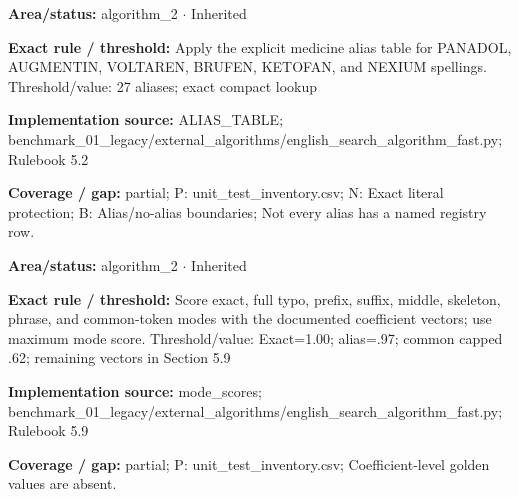 \begin{tcolorbox}[enhanced,breakable,colback=white,colframe=Muted!45,boxrule=0.45pt,arc=1.5pt,left=6pt,right=6pt,top=5pt,bottom=5pt,title={\texttt{A2-MEDICINE-ALIASES-04}},title after break={\texttt{A2-MEDICINE-ALIASES-04}\ (continued)},fonttitle=\headingfont\bfseries\color{Navy},coltitle=Navy]
\textbf{Area/status:} algorithm\_\allowbreak{}2 $\boldsymbol{\cdot}$ Inherited\par
\smallskip
\textbf{Exact rule / threshold:} Apply the explicit medicine alias table for PANADOL, AUGMENTIN, VOLTAREN, BRUFEN, KETOFAN, and NEXIUM spellings. Threshold/\allowbreak{}value: 27 aliases; exact compact lookup\par
\smallskip
\textbf{Implementation source:} ALIAS\_\allowbreak{}TABLE; benchmark\_\allowbreak{}01\_\allowbreak{}legacy/\allowbreak{}external\_\allowbreak{}algorithms/\allowbreak{}english\_\allowbreak{}search\_\allowbreak{}algorithm\_\allowbreak{}fast.py; Rulebook 5.2\par
\smallskip
\textbf{Coverage / gap:} partial; P: unit\_\allowbreak{}test\_\allowbreak{}inventory.csv; N: Exact literal protection; B: Alias/\allowbreak{}no-alias boundaries; Not every alias has a named registry row.
\end{tcolorbox}
\begin{tcolorbox}[enhanced,breakable,colback=white,colframe=Muted!45,boxrule=0.45pt,arc=1.5pt,left=6pt,right=6pt,top=5pt,bottom=5pt,title={\texttt{A2-MODE-SCORES-11}},title after break={\texttt{A2-MODE-SCORES-11}\ (continued)},fonttitle=\headingfont\bfseries\color{Navy},coltitle=Navy]
\textbf{Area/status:} algorithm\_\allowbreak{}2 $\boldsymbol{\cdot}$ Inherited\par
\smallskip
\textbf{Exact rule / threshold:} Score exact, full typo, prefix, suffix, middle, skeleton, phrase, and common-token modes with the documented coefficient vectors; use maximum mode score. Threshold/\allowbreak{}value: Exact=1.00; alias=.97; common capped .62; remaining vectors in Section 5.9\par
\smallskip
\textbf{Implementation source:} mode\_\allowbreak{}scores; benchmark\_\allowbreak{}01\_\allowbreak{}legacy/\allowbreak{}external\_\allowbreak{}algorithms/\allowbreak{}english\_\allowbreak{}search\_\allowbreak{}algorithm\_\allowbreak{}fast.py; Rulebook 5.9\par
\smallskip
\textbf{Coverage / gap:} partial; P: unit\_\allowbreak{}test\_\allowbreak{}inventory.csv; Coefficient-level golden values are absent.
\end{tcolorbox}
